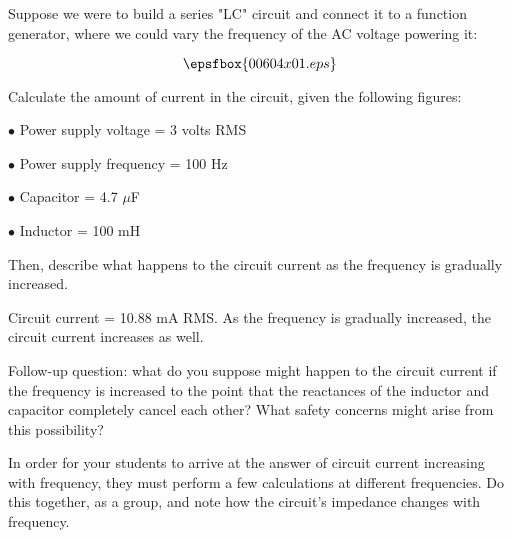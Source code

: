 

Suppose we were to build a series "LC" circuit and connect it to a function generator, where we could vary the frequency of the AC voltage powering it:

$$\epsfbox{00604x01.eps}$$

Calculate the amount of current in the circuit, given the following figures:

\medskip
\item{$\bullet$} Power supply voltage = 3 volts RMS
\item{$\bullet$} Power supply frequency = 100 Hz
\item{$\bullet$} Capacitor = 4.7 $\mu$F
\item{$\bullet$} Inductor = 100 mH
\medskip

Then, describe what happens to the circuit current as the frequency is gradually increased.







Circuit current = 10.88 mA RMS.  As the frequency is gradually increased, the circuit current increases as well.

\vskip 10pt

Follow-up question: what do you suppose might happen to the circuit current if the frequency is increased to the point that the reactances of the inductor and capacitor completely cancel each other?  What safety concerns might arise from this possibility?







In order for your students to arrive at the answer of circuit current increasing with frequency, they must perform a few calculations at different frequencies.  Do this together, as a group, and note how the circuit's impedance changes with frequency.




